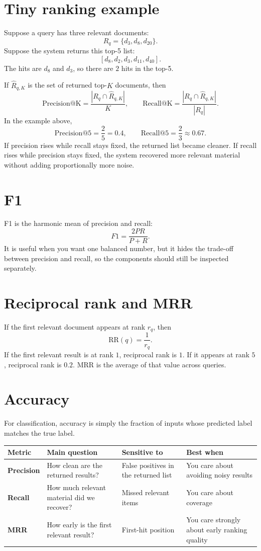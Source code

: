 \documentclass[11pt,oneside]{report}
\begin{document}
\section*{Tiny ranking example}
Suppose a query has three relevant documents:
\[
R_q=\{d_3,d_8,d_{20}\}.
\]
Suppose the system returns this top-5 list:
\[
[d_8,d_2,d_3,d_{11},d_{40}].
\]
The hits are $d_8$ and $d_3$, so there are $2$ hits in the top-5.

\begin{formulabox}
If $\hat{R}_{q,K}$ is the set of returned top-$K$ documents, then
\[
\mathrm{Precision@K}=\frac{|R_q\cap \hat{R}_{q,K}|}{K},
\qquad
\mathrm{Recall@K}=\frac{|R_q\cap \hat{R}_{q,K}|}{|R_q|}.
\]
In the example above,
\[
\mathrm{Precision@5}=\frac{2}{5}=0.4,
\qquad
\mathrm{Recall@5}=\frac{2}{3}\approx 0.67.
\]
If precision rises while recall stays fixed, the returned list became cleaner. If recall rises while precision stays fixed, the system recovered more relevant material without adding proportionally more noise.
\end{formulabox}

\section*{F1}
F1 is the harmonic mean of precision and recall:
\[
F1=\frac{2PR}{P+R}.
\]
It is useful when you want one balanced number, but it hides the trade-off between precision and recall, so the components should still be inspected separately.

\section*{Reciprocal rank and MRR}
If the first relevant document appears at rank $r_q$, then
\[
\mathrm{RR}(q)=\frac{1}{r_q}.
\]
If the first relevant result is at rank $1$, reciprocal rank is $1$. If it appears at rank $5$, reciprocal rank is $0.2$. MRR is the average of that value across queries.

\section*{Accuracy}
For classification, accuracy is simply the fraction of inputs whose predicted label matches the true label.

\begin{center}
\begin{tabularx}{\textwidth}{>{\bfseries}lYYY}
\toprule
Metric & Main question & Sensitive to & Best when \\
\midrule
Precision & How clean are the returned results? & False positives in the returned list & You care about avoiding noisy results \\
Recall & How much relevant material did we recover? & Missed relevant items & You care about coverage \\
MRR & How early is the first relevant result? & First-hit position & You care strongly about early ranking quality \\
\bottomrule
\end{tabularx}
\end{center}
\end{document}
